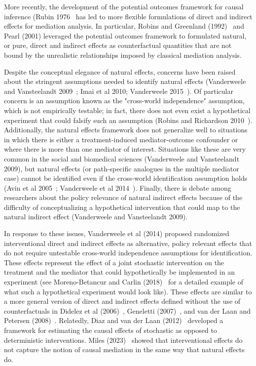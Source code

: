 \documentclass[11pt]{article} %
\numberwithin{equation}{section} %
\begin{document}
More recently, the development of the potential outcomes framework for causal inference (Rubin 1976~\citep{rubin1976} has led to more flexible formulations of direct and indirect effects for mediation analysis. In particular, Robins and Greenland (1992)~\citep{robinsgreenland1992} and Pearl (2001) leveraged the potential outcomes framework to formulated natural, or pure, direct and indirect effects as counterfactual quantities that are not bound by the unrealistic relationships imposed by classical mediation analysis. 

Despite the conceptual elegance of natural effects, concerns have been raised about the stringent assumptions needed to identify natural effects (Vanderweele and Vansteelandt 2009~\citep{vanderweelevansteelandt2009}; Imai et al 2010; Vanderweele 2015~\citep{vanderweele2015}). Of particular concern is an assumption known as the "cross-world independence" assumption, which is not empirically testable; in fact, there does not even exist a hypothetical experiment that could falsify such an assumption (Robins and Richardson 2010~\citep{robinsrichardson2010}). Additionally, the natural effects framework does not generalize well to situations in which there is either a treatment-induced mediator-outcome confounder or where there is more than one mediator of interest. Situations like these are very common in the social and biomedical sciences (Vanderweele and Vansteelandt 2009), but natural effects (or path-specific analogues in the multiple mediator case) cannot be identified even if the cross-world identification assumption holds (Avin et al 2005~\citep{avinetal2005}; Vanderweele et al 2014~\citep{vanderweeleetal2014}). Finally, there is debate among researchers about the policy relevance of natural indirect effects because of the difficulty of conceptualizing a hypothetical intervention that could map to the natural indirect effect (Vanderweele and Vansteelandt 2009). 

In response to these issues, Vanderweele et al (2014) proposed randomized interventional direct and indirect effects as alternative, policy relevant effects that do not require untestable cross-world independence assumptions for identification. These effects represent the effect of a joint stochastic intervention on the treatment and the mediator that could hypothetically be implemented in an experiment (see Moreno-Betancur and Carlin (2018)~\citep{morenobetancur2018} for a detailed example of what such a hypothetical experiment would look like). These effects are similar to a more general version of direct and indirect effects defined without the use of counterfactuals in Didelez et al (2006)~\citep{didelez2006}, Geneletti (2007)~\citep{geneletti2007}, and van der Laan and Petersen (2008)~\citep{vanderlaanpetersen2008}. Relatedly, Diaz and van der Laan (2012)~\citep{diazvanderlaan2012} developed a framework for estimating the causal effects of stochastic as opposed to deterministic interventions. Miles (2023)~\citep{miles2023} showed that interventional effects do not capture the notion of causal mediation in the same way that natural effects do. 
\end{document}
